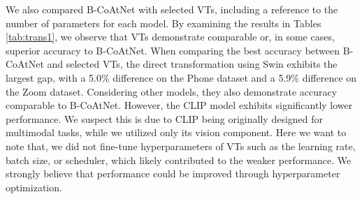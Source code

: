 We also compared B-CoAtNet with selected VTs, including a reference to the number of parameters for each model. By examining the results in Tables \ref{tab:trans1}, we observe that VTs demonstrate comparable or, in some cases, superior accuracy to B-CoAtNet. 
When comparing the best accuracy between B-CoAtNet and selected VTs, the direct transformation using Swin exhibits the largest gap, with a 5.0\% difference on the Phone dataset and a 5.9\% difference on the Zoom dataset.
Considering other models, they also demonstrate accuracy comparable to B-CoAtNet. 
However, the CLIP model exhibits significantly lower performance. We suspect this is due to CLIP being originally designed for multimodal tasks, while we utilized only its vision component. Here we want to note that, we did not fine-tune hyperparameters of VTs such as the learning rate, batch size, or scheduler, which likely contributed to the weaker performance. We strongly believe that performance could be improved through hyperparameter optimization.
